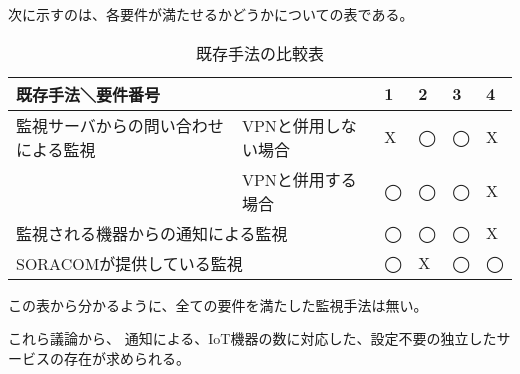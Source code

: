 	次に示すのは、各要件が満たせるかどうかについての表である。\\
	\begin{table}[htbp]
	\caption{既存手法の比較表}
	\begin{tabular}{|l|l|l|l|l|l|} \hline
		\multicolumn{2}{|l|}{既存手法＼要件番号} & 
		\multicolumn{1}{|l|}{1} &
		\multicolumn{1}{|l|}{2} &
		\multicolumn{1}{|l|}{3} &
		\multicolumn{1}{|l|}{4} \\ \hline \hline
		監視サーバからの問い合わせによる監視 & VPNと併用しない場合 & X & ◯ & ◯ & X  \\ \cline{2-6}
			& VPNと併用する場合 & ◯ & ◯ & ◯ & X \\ \hline
		\multicolumn{2}{|l|}{監視される機器からの通知による監視} & ◯ & ◯ & ◯ & X \\ \hline
		\multicolumn{2}{|l|}{SORACOMが提供している監視} & ◯ & X & ◯ & ◯ \\ \hline
	\end{tabular}
	\end{table}
	この表から分かるように、全ての要件を満たした監視手法は無い。
	
	これら議論から、
	通知による、IoT機器の数に対応した、設定不要の独立したサービスの存在が求められる。

